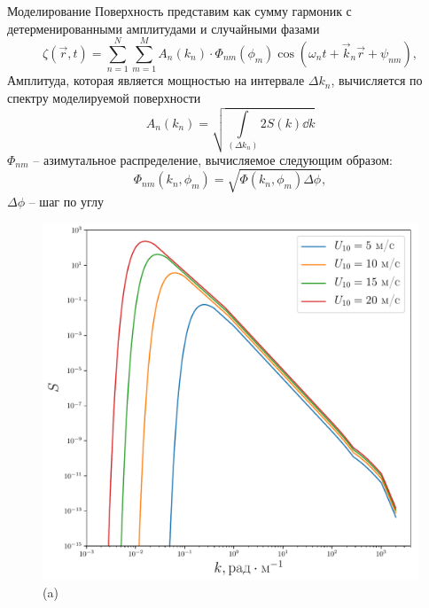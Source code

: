 \begin{frame}[t]{}
\begin{columns}[t]
\begin{column}{.48\linewidth}
\begin{block}{Моделирование}
            Поверхность представим как сумму гармоник с детерменированными амплитудами и случайными фазами
        \begin{equation}
            \zeta(\vec r, t)= \sum\limits_{n=1}^N \sum_{m=1}^M A_n(k_n)\cdot 
            \Phi_{nm}(\phi_m) \cos(\omega_n t + \vec k_n \vec r + \psi_{nm}),
        \end{equation}
        Амплитуда, которая является мощностью на интервале $\Delta k_n$, вычисляется по спектру моделируемой поверхности
        \begin{equation}
            A_n(k_n)=\sqrt{ \int\limits_{(\Delta k_n)}  2 S(k) \dd{k}}
        \end{equation}
        $\Phi_{nm}$ -- азимутальное распределение, вычисляемое следующим образом:
        \begin{equation}
        \Phi_{nm}(k_n,\phi_m)=\sqrt{\Phi(k_n,\phi_m) \Delta \phi},
        \end{equation}
        $\Delta \phi$ -- шаг по углу
        \begin{figure}[h]
            \begin{minipage}{0.24\linewidth}
                \includegraphics[width=\linewidth]{fig/full_spectrum1}
                \centering
                (a)
            \end{minipage}
            \begin{minipage}{0.24\linewidth}

\end{minipage}
\end{figure}
\end{block}
\end{column}
\end{columns}
\end{frame}
